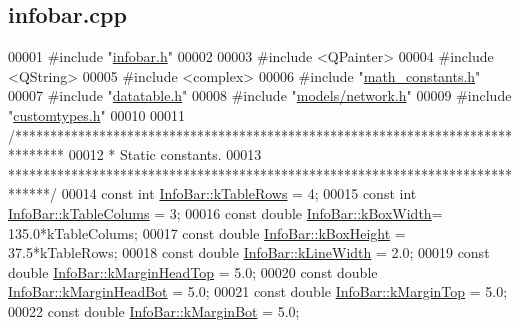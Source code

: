 \hypertarget{infobar_8cpp_source}{}\subsection{infobar.\+cpp}
\label{infobar_8cpp_source}

\begin{DoxyCode}
00001 \textcolor{preprocessor}{#include "\hyperlink{infobar_8h}{infobar.h}"}
00002 
00003 \textcolor{preprocessor}{#include <QPainter>}
00004 \textcolor{preprocessor}{#include <QString>}
00005 \textcolor{preprocessor}{#include <complex>}
00006 \textcolor{preprocessor}{#include "\hyperlink{math__constants_8h}{math\_constants.h}"}
00007 \textcolor{preprocessor}{#include "\hyperlink{datatable_8h}{datatable.h}"}
00008 \textcolor{preprocessor}{#include "\hyperlink{network_8h}{models/network.h}"}
00009 \textcolor{preprocessor}{#include "\hyperlink{customtypes_8h}{customtypes.h}"}
00010 
00011 \textcolor{comment}{/*******************************************************************************}
00012 \textcolor{comment}{ * Static constants.}
00013 \textcolor{comment}{ ******************************************************************************/}
00014 \textcolor{keyword}{const} \textcolor{keywordtype}{int} \hyperlink{class_info_bar_ad54d2dd19a63caf9d2476aace60ae3c5}{InfoBar::kTableRows}  = 4;
00015 \textcolor{keyword}{const} \textcolor{keywordtype}{int} \hyperlink{class_info_bar_a57e9e7c40a6fd2a56dd47a4512d65489}{InfoBar::kTableColums} = 3;
00016 \textcolor{keyword}{const} \textcolor{keywordtype}{double} \hyperlink{class_info_bar_a58f7773f4265d7e759f2eeb4c9aac48d}{InfoBar::kBoxWidth}= 135.0*kTableColums;
00017 \textcolor{keyword}{const} \textcolor{keywordtype}{double} \hyperlink{class_info_bar_aedf2e766968ea9ba3e691f24efb8c117}{InfoBar::kBoxHeight} = 37.5*kTableRows;
00018 \textcolor{keyword}{const} \textcolor{keywordtype}{double} \hyperlink{class_info_bar_a9592abdb63cc3cfffc6e5826f998a353}{InfoBar::kLineWidth} = 2.0;
00019 \textcolor{keyword}{const} \textcolor{keywordtype}{double} \hyperlink{class_info_bar_ae4ec64a4c58d29eb6c7378b4621bc6c2}{InfoBar::kMarginHeadTop} = 5.0;
00020 \textcolor{keyword}{const} \textcolor{keywordtype}{double} \hyperlink{class_info_bar_aed15b9f28cc4a43d509c3553b032fa5e}{InfoBar::kMarginHeadBot} = 5.0;
00021 \textcolor{keyword}{const} \textcolor{keywordtype}{double} \hyperlink{class_info_bar_a810c3286fc4d960d04ffbd31318ebff2}{InfoBar::kMarginTop} = 5.0;
00022 \textcolor{keyword}{const} \textcolor{keywordtype}{double} \hyperlink{class_info_bar_a18194bb46d36b00aa9f0d01f24a87617}{InfoBar::kMarginBot} = 5.0;

\end{DoxyCode}
